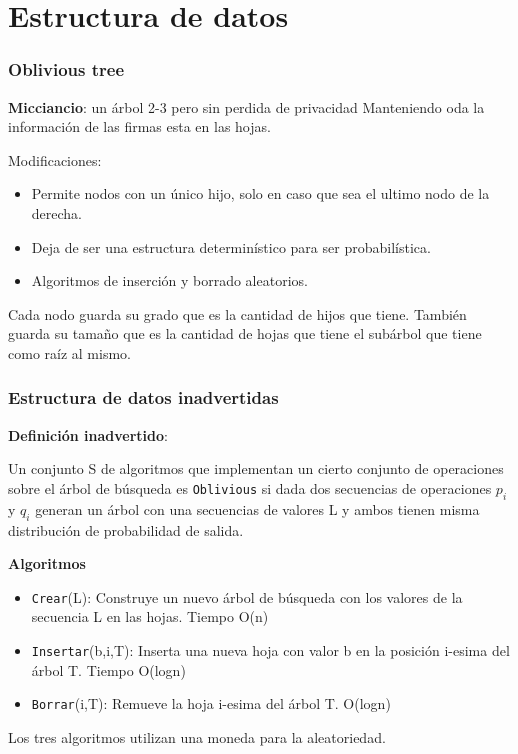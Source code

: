 \documentclass[10pt]{beamer}
\begin{document}
\section{Estructura de datos}
\begin{frame}
\frametitle{Oblivious tree}

\textbf{Micciancio}: un árbol 2-3 pero sin perdida de privacidad Manteniendo oda la información de las firmas esta en las hojas.

Modificaciones:
\begin{itemize}
\pause
  \item Permite nodos con un único hijo, solo en caso que sea el ultimo nodo de la derecha.
\pause
  \item Deja de ser una estructura determinístico para ser probabilística.
  \item Algoritmos de inserción y borrado aleatorios.
\end{itemize}

\pause
Cada nodo guarda su grado que es la cantidad de hijos que tiene.
También guarda su tamaño que es la cantidad de hojas que tiene el subárbol que tiene como
raíz al mismo.
\end{frame}



\begin{frame}
\frametitle{Estructura de datos inadvertidas}

\textbf{Definición inadvertido}:

Un conjunto S de algoritmos que implementan un cierto conjunto de operaciones sobre el árbol de búsqueda es
\texttt{Oblivious} si dada dos secuencias de operaciones $p_i$ y $q_i$ generan un árbol con una secuencias
de valores L y ambos tienen misma distribución de probabilidad de salida.


\pause
\textbf{Algoritmos}
\begin{itemize}
  \item \texttt{Crear}(L): Construye un nuevo árbol de búsqueda con los valores de la secuencia L en las hojas. Tiempo O(n)
\pause
  \item \texttt{Insertar}(b,i,T): Inserta una nueva hoja con valor b en la posición i-esima del árbol T. Tiempo O(logn)
\pause
  \item \texttt{Borrar}(i,T): Remueve la hoja i-esima del árbol T. O(logn)
\end{itemize}

\pause
Los tres algoritmos utilizan una moneda para la aleatoriedad.


\end{frame}
\end{document}
